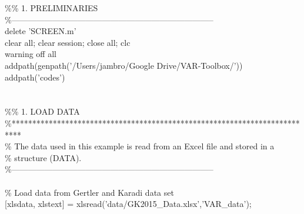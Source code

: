\hspace{1mm}\textcolor{matlabgreen}{\%}\textcolor{matlabgreen}{\% 1. PRELIMINARIES }\\ 
\hspace{1mm}\textcolor{matlabgreen}{\%--------------------------------------------------------------------------  }\\ 
\hspace{1mm}delete \textcolor{matlabpurple}{'SCREEN.m'}  \\ 
\hspace{1mm}clear all; clear session; close all; clc \\ 
\hspace{1mm}warning off all \\ 
\hspace{1mm}addpath(genpath(\textcolor{matlabpurple}{'/Users/jambro/Google Drive/VAR-Toolbox/'})) \\ 
\hspace{1mm}addpath(\textcolor{matlabpurple}{'codes'}) \\ 
\hspace{1mm} \\ 
\hspace{1mm} \\ 
\hspace{1mm}\textcolor{matlabgreen}{\%}\textcolor{matlabgreen}{\% 1. LOAD DATA }\\ 
\hspace{1mm}\textcolor{matlabgreen}{\%**************************************************************************  }\\ 
\hspace{1mm}\textcolor{matlabgreen}{\% The data used in this example is read from an Excel file and stored in a }\\ 
\hspace{1mm}\textcolor{matlabgreen}{\% structure (DATA). }\\ 
\hspace{1mm}\textcolor{matlabgreen}{\%--------------------------------------------------------------------------  }\\ 
\hspace{1mm} \\ 
\hspace{1mm}\textcolor{matlabgreen}{\% Load data from Gertler and Karadi data set }\\ 
\hspace{1mm}[xlsdata, xlstext] = xlsread(\textcolor{matlabpurple}{'data/GK2015\_Data.xlsx'},\textcolor{matlabpurple}{'VAR\_data'}); \\ 

